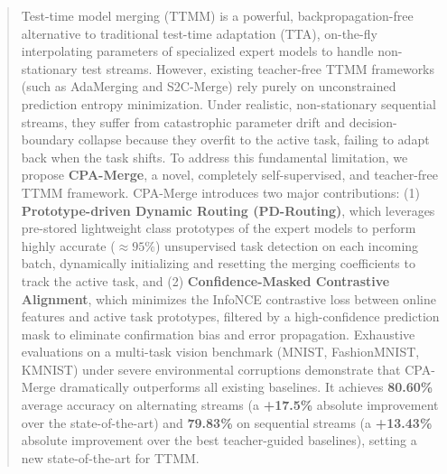 \documentclass{article}
\theoremstyle{plain}
\theoremstyle{definition}
\theoremstyle{remark}
\begin{document}

\printAffiliationsAndNotice{}

\begin{abstract}
Test-time model merging (TTMM) is a powerful, backpropagation-free alternative to traditional test-time adaptation (TTA), on-the-fly interpolating parameters of specialized expert models to handle non-stationary test streams. However, existing teacher-free TTMM frameworks (such as AdaMerging and S2C-Merge) rely purely on unconstrained prediction entropy minimization. Under realistic, non-stationary sequential streams, they suffer from catastrophic parameter drift and decision-boundary collapse because they overfit to the active task, failing to adapt back when the task shifts. To address this fundamental limitation, we propose \textbf{CPA-Merge}, a novel, completely self-supervised, and teacher-free TTMM framework. CPA-Merge introduces two major contributions: (1) \textbf{Prototype-driven Dynamic Routing (PD-Routing)}, which leverages pre-stored lightweight class prototypes of the expert models to perform highly accurate ($\approx 95\%$) unsupervised task detection on each incoming batch, dynamically initializing and resetting the merging coefficients to track the active task, and (2) \textbf{Confidence-Masked Contrastive Alignment}, which minimizes the InfoNCE contrastive loss between online features and active task prototypes, filtered by a high-confidence prediction mask to eliminate confirmation bias and error propagation. Exhaustive evaluations on a multi-task vision benchmark (MNIST, FashionMNIST, KMNIST) under severe environmental corruptions demonstrate that CPA-Merge dramatically outperforms all existing baselines. It achieves \textbf{80.60\%} average accuracy on alternating streams (a \textbf{+17.5\%} absolute improvement over the state-of-the-art) and \textbf{79.83\%} on sequential streams (a \textbf{+13.43\%} absolute improvement over the best teacher-guided baselines), setting a new state-of-the-art for TTMM.
\end{abstract}
\end{document}
